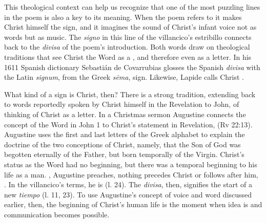 This theological context can help us recognize that one of the most puzzling
lines in the poem is also a key to its meaning. 
When the poem refers to  it makes
Christ himself the sign, and it imagines the sound of Christ's infant voice not
as words but as music. 
The \emph{signo} in this line of the villancico's estribillo connects back to
the \emph{divisa} of the poem's introduction.
Both words draw on theological traditions that see Christ the Word as a
, and therefore even as a letter.
In his 1611 Spanish dictionary Sebastián de Covarrubias glosses the Spanish
\emph{divisa} with the Latin \emph{signum}, from the Greek \emph{sēma}, sign. 
Likewise, Lapide calls Christ .%
    \Autocites
    []{Covarrubias:Tesoro}
    [685--686, on Lk 2]{Lapide:Gospels19C} %

What kind of a sign is Christ, then?
There is a strong tradition, extending back to words reportedly spoken by Christ
himself in the Revelation to John, of thinking of Christ as a letter.
In a Christmas sermon Augustine connects the concept of the Word in John 1 to
Christ's statement in Revelation,  (Rv 22:13).
Augustine uses the first and last letters of the Greek alphabet to explain the
doctrine of the two conceptions of Christ, namely, that the Son of God was
begotten eternally of the Father, but born temporally of the Virgin.
Christ's status as the Word had no beginning, but there was a temporal beginning
to his life as a man.
, Augustine preaches,
nothing precedes Christ or follows after him, .%
    \Autocites
    [vol. 10, 118r, In Natali Domini 2: .]
    {Augustine:Opera1555}
    [on Rv 1]{Lapide:Apocalypse1627}
In the villancico's terms, he is  (l. 24).
The \emph{divisa}, then, signifies the start of a new \emph{tiempo} (l.  11,
23).
To use Augustine's concept of voice and word discussed earlier, then, the
beginning of Christ's human life is the moment when idea is  and communication becomes possible.

